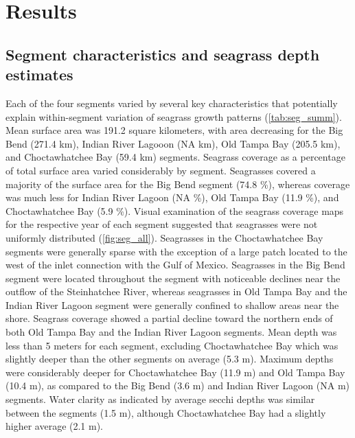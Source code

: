 \documentclass[letterpaper,12pt,oneside]{article}\usepackage[]{graphicx}\usepackage[]{color}
\begin{document}
\section{Results}

\subsection{Segment characteristics and seagrass depth estimates}



Each of the four segments varied by several key characteristics that potentially explain within-segment variation of seagrass growth patterns (\cref{tab:seg_summ}).  Mean surface area was 191.2 square kilometers, with area decreasing for the Big Bend (271.4 km), Indian River Lagooon (NA km), Old Tampa Bay (205.5 km), and Choctawhatchee Bay (59.4 km) segments.  Seagrass coverage as a percentage of total surface area varied considerably by segment.  Seagrasses covered a majority of the surface area for the Big Bend segment (74.8 \%), whereas coverage was much less for Indian River Lagoon (NA \%), Old Tampa Bay (11.9 \%), and Choctawhatchee Bay (5.9 \%).  Visual examination of the seagrass coverage maps for the respective year of each segment suggested that seagrasses were not uniformly distributed (\cref{fig:seg_all}).  Seagrasses in the Choctawhatchee Bay segments were generally sparse with the exception of a large patch located to the west of the inlet connection with the Gulf of Mexico.  Seagrasses in the Big Bend segment were located throughout the segment with noticeable declines near the outflow of the Steinhatchee River, whereas seagrasses in Old Tampa Bay and the Indian River Lagoon segment were generally confined to shallow areas near the shore. Seagrass coverage showed a partial decline toward the northern ends of both Old Tampa Bay and the Indian River Lagoon segments.  Mean depth was less than 5 meters for each segment, excluding Choctawhatchee Bay which was slightly deeper than the other segments on average (5.3 m).  Maximum depths were considerably deeper for Choctawhatchee Bay (11.9 m) and Old Tampa Bay (10.4 m), as compared to the Big Bend (3.6 m) and Indian River Lagoon (NA m) segments.  Water clarity as indicated by average secchi depths was similar between the segments (1.5 m), although Choctawhatchee Bay had a slightly higher average (2.1 m).     

\end{document}
